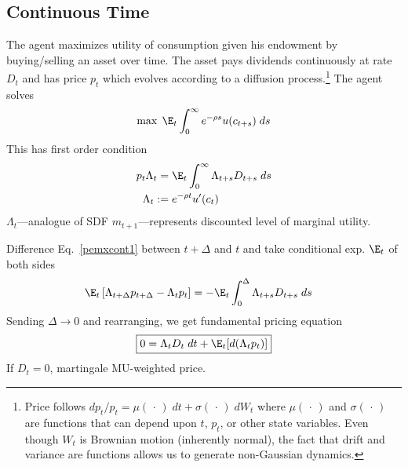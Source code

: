 \documentclass[12pt]{article}
\theoremstyle{plain}
\theoremstyle{definition}
\theoremstyle{remark}
\newcommand{\ra}{\rightarrow}
\begin{document}
\begin{multicols*}{2}
\clearpage
\subsection{Continuous Time}

The agent maximizes utility of consumption given his endowment by
buying/selling an asset over time. The asset pays dividends continuously
at rate $D_t$ and has price $p_t$ which evolves according to
a diffusion process.\footnote{%
  Price follows
  $dp_t/p_t = \mu(\,\cdot\,)\; dt + \sigma(\,\cdot\,) \; dW_t$
  where $\mu(\,\cdot\,)$ and $\sigma(\,\cdot\,)$ are functions that can
  depend upon $t$, $p_t$, or other state variables.
  Even though $W_t$ is Brownian motion (inherently normal), the fact
  that drift and variance are functions allows us to generate
  non-Gaussian dynamics.
}
The agent solves
\begin{align*}
  \max \;
  \E_t \int_{0}^\infty e^{-\rho s} u(c_{t+s})\; ds
\end{align*}
This has first order condition
\begin{align}
  p_t\Lambda_t
  =&\; \E_t
  \int_{0}^\infty \Lambda_{t+s}D_{t+s}\; ds
  \label{pemxcont1}
  \\
  \Lambda_t :=&\; e^{-\rho t} u'(c_t)
\end{align}
$\Lambda_t$---analogue of SDF $m_{t+1}$---represents
discounted level of marginal utility.

Difference Eq.~\ref{pemxcont1} between $t+\Delta$ and $t$ and take
conditional exp. $\E_t$ of both sides
\begin{align*}
  \E_t
  \left[
  \Lambda_{t+\Delta}p_{t+\Delta}
  -\Lambda_tp_t
  \right]
  &=
  -\E_t
  \int_{0}^\Delta \Lambda_{t+s}D_{t+s}\; ds
\end{align*}
Sending $\Delta\ra 0$ and rearranging, we get
fundamental pricing equation
\begin{align}
  \boxed{%
  0 = \Lambda_t D_t \;dt + \E_t[d(\Lambda_tp_t)]
  }
  \label{pemxcont2}
\end{align}
If $D_t=0$, martingale MU-weighted price.


\end{multicols*}
\end{document}
